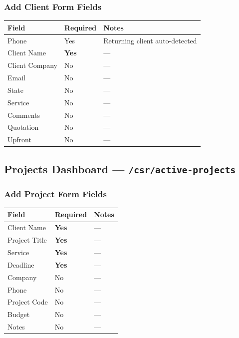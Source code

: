 \documentclass[11pt,a4paper]{article}
\begin{document}
\subsubsection{Add Client Form Fields}
\begin{longtable}{@{}p{4cm}p{2cm}p{8cm}@{}}
\toprule
\textbf{Field} & \textbf{Required} & \textbf{Notes} \\
\midrule
Phone           & Yes     & Returning client auto-detected \\
Client Name     & \textbf{Yes} & --- \\
Client Company  & No      & --- \\
Email           & No      & --- \\
State           & No      & --- \\
Service         & No      & --- \\
Comments        & No      & --- \\
Quotation       & No      & --- \\
Upfront         & No      & --- \\
\bottomrule
\end{longtable}

\subsection{Projects Dashboard --- \texttt{/csr/active-projects}}

\subsubsection{Add Project Form Fields}
\begin{longtable}{@{}p{4cm}p{2cm}p{8cm}@{}}
\toprule
\textbf{Field} & \textbf{Required} & \textbf{Notes} \\
\midrule
Client Name     & \textbf{Yes} & --- \\
Project Title   & \textbf{Yes} & --- \\
Service         & \textbf{Yes} & --- \\
Deadline        & \textbf{Yes} & --- \\
Company         & No      & --- \\
Phone           & No      & --- \\
Project Code    & No      & --- \\
Budget          & No      & --- \\
Notes           & No      & --- \\
\bottomrule
\end{longtable}
\end{document}
